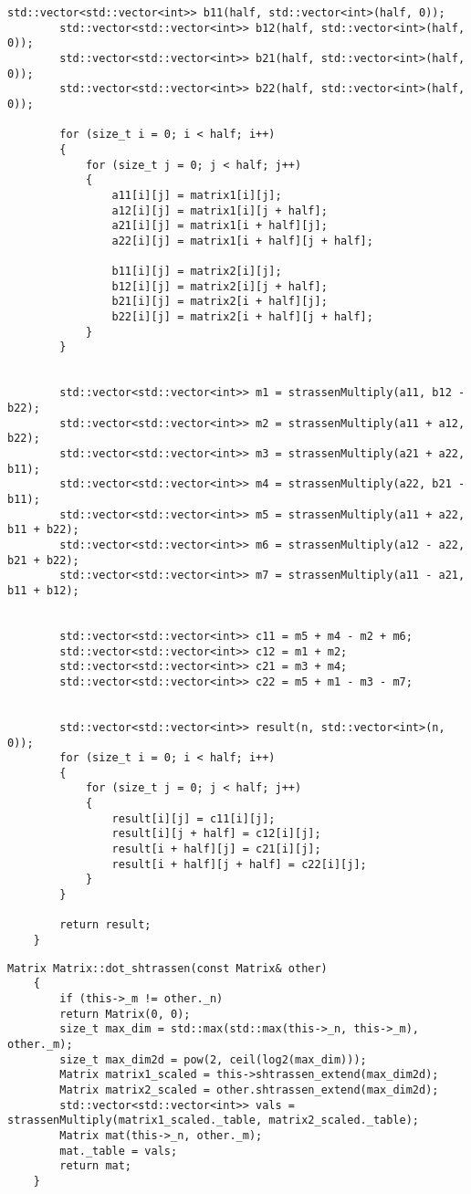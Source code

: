 \begin{appendices}
\begin{lstlisting}[label=lst:stras,caption=Реализация алгоритма расчета произведения матриц Штрассена]
		std::vector<std::vector<int>> b11(half, std::vector<int>(half, 0));
		std::vector<std::vector<int>> b12(half, std::vector<int>(half, 0));
		std::vector<std::vector<int>> b21(half, std::vector<int>(half, 0));
		std::vector<std::vector<int>> b22(half, std::vector<int>(half, 0));
		
		for (size_t i = 0; i < half; i++)
		{
			for (size_t j = 0; j < half; j++)
			{
				a11[i][j] = matrix1[i][j];
				a12[i][j] = matrix1[i][j + half];
				a21[i][j] = matrix1[i + half][j];
				a22[i][j] = matrix1[i + half][j + half];
				
				b11[i][j] = matrix2[i][j];
				b12[i][j] = matrix2[i][j + half];
				b21[i][j] = matrix2[i + half][j];
				b22[i][j] = matrix2[i + half][j + half];
			}
		}
		
		
		std::vector<std::vector<int>> m1 = strassenMultiply(a11, b12 - b22);
		std::vector<std::vector<int>> m2 = strassenMultiply(a11 + a12, b22);
		std::vector<std::vector<int>> m3 = strassenMultiply(a21 + a22, b11);
		std::vector<std::vector<int>> m4 = strassenMultiply(a22, b21 - b11);
		std::vector<std::vector<int>> m5 = strassenMultiply(a11 + a22, b11 + b22);
		std::vector<std::vector<int>> m6 = strassenMultiply(a12 - a22, b21 + b22);
		std::vector<std::vector<int>> m7 = strassenMultiply(a11 - a21, b11 + b12);
		
		
		std::vector<std::vector<int>> c11 = m5 + m4 - m2 + m6;
		std::vector<std::vector<int>> c12 = m1 + m2;
		std::vector<std::vector<int>> c21 = m3 + m4;
		std::vector<std::vector<int>> c22 = m5 + m1 - m3 - m7;
		
		
		std::vector<std::vector<int>> result(n, std::vector<int>(n, 0));
		for (size_t i = 0; i < half; i++)
		{
			for (size_t j = 0; j < half; j++)
			{
				result[i][j] = c11[i][j];
				result[i][j + half] = c12[i][j];
				result[i + half][j] = c21[i][j];
				result[i + half][j + half] = c22[i][j];
			}
		}
		
		return result;
	}
	\end{lstlisting}
	
	
	
	\begin{lstlisting}[label=lst:stras_meth,caption= Метод расчета произведения алгоритмом штрассена с расширением исходной матрицы]
	Matrix Matrix::dot_shtrassen(const Matrix& other)
	{
		if (this->_m != other._n)
		return Matrix(0, 0);
		size_t max_dim = std::max(std::max(this->_n, this->_m), other._m);
		size_t max_dim2d = pow(2, ceil(log2(max_dim)));
		Matrix matrix1_scaled = this->shtrassen_extend(max_dim2d);
		Matrix matrix2_scaled = other.shtrassen_extend(max_dim2d);
		std::vector<std::vector<int>> vals = strassenMultiply(matrix1_scaled._table, matrix2_scaled._table);
		Matrix mat(this->_n, other._m);
		mat._table = vals;
		return mat;
	}
	\end{lstlisting}
	

\end{appendices}
